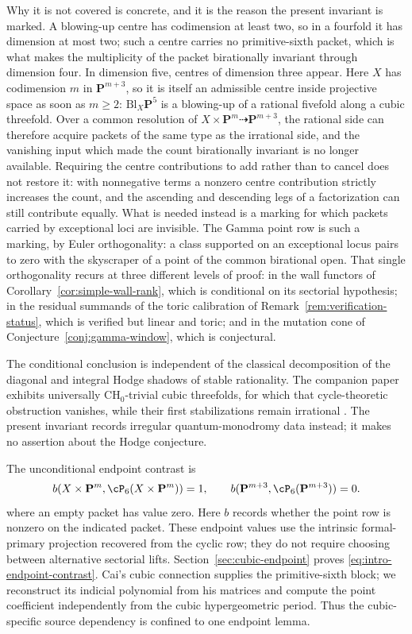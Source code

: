 Why it is not covered is concrete, and it is the reason the present invariant
is marked.  A blowing-up centre has codimension at least two, so in a fourfold
it has dimension at most two; such a centre carries no primitive-sixth packet,
which is what makes the multiplicity of the packet birationally invariant
through dimension four.  In dimension five, centres of dimension three appear.
Here \(X\) has codimension \(m\) in \(\mathbf P^{m+3}\), so it is itself an
admissible centre inside projective space as soon as \(m\geq2\):
\(\mathrm{Bl}_X\mathbf P^5\) is a blowing-up of a rational fivefold along a
cubic threefold.  Over a common resolution of
\(X\times\mathbf P^m\dashrightarrow\mathbf P^{m+3}\), the rational side can
therefore acquire packets of the same type as the irrational side, and the
vanishing input which made the count birationally invariant is no longer
available.  Requiring the centre contributions to add rather than to cancel
does not restore it: with nonnegative terms a nonzero centre contribution
strictly increases the count, and the ascending and descending legs of a
factorization can still contribute equally.  What is needed instead is a marking for which packets carried by
exceptional loci are invisible.  The Gamma point row is such a marking, by
Euler orthogonality: a class supported on an exceptional locus pairs to zero
with the skyscraper of a point of the common birational open.  That single
orthogonality recurs at three different levels of proof: in the wall functors
of Corollary~\ref{cor:simple-wall-rank}, which is conditional on its sectorial
hypothesis; in the residual summands of the toric calibration of
Remark~\ref{rem:verification-status}, which is verified but linear and toric;
and in the mutation cone of Conjecture~\ref{conj:gamma-window}, which is
conjectural.

The conditional conclusion is independent of the classical decomposition of
the diagonal and integral Hodge shadows of stable rationality.  The companion paper
exhibits universally \(\mathrm{CH}_0\)-trivial cubic threefolds, for which that
cycle-theoretic obstruction vanishes, while their first stabilizations remain
irrational \cite{RuddEpilogue}.  The present invariant records irregular
quantum-monodromy data instead; it makes no assertion about the Hodge
conjecture.

The unconditional endpoint contrast is
\begin{equation}\label{eq:intro-endpoint-contrast}
 b(X\times\mathbf P^m,\cP_6(X\times\mathbf P^m))=1,
 \qquad b(\mathbf P^{m+3},\cP_6(\mathbf P^{m+3}))=0.
\end{equation}
where an empty packet has value zero.  Here \(b\) records whether the point
row is nonzero on the indicated packet.  These endpoint values use the
intrinsic formal-primary projection recovered from the cyclic row; they do
not require choosing between alternative sectorial lifts.
Section~\ref{sec:cubic-endpoint}
proves \eqref{eq:intro-endpoint-contrast}.  Cai's cubic connection supplies
the primitive-sixth block; we
reconstruct its indicial polynomial from his matrices and compute the point
coefficient independently from the cubic hypergeometric period.  Thus the
cubic-specific source dependency is confined to one endpoint lemma.

